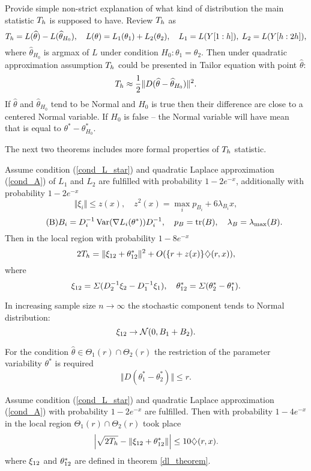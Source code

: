 Provide simple non-strict explanation of what kind of distribution the main statistic  $T_h$ is supposed to have. Review  $T_h$ as
\[
T_h = L(\widehat{\theta}) -  L(\widehat{\theta}_{H_0}), 
\quad L(\theta) = L_1(\theta_1) + L_2(\theta_2), 
\quad L_1 = L(Y[1:h]), \; L_2 = L(Y[h:2h]), 
\]
where $\widehat{\theta}_{H_0}$ is argmax of $L$ under condition $H_0: \theta_1 =\theta_2$. Then under quadratic approximation assumption $T_h$ could be presented in Tailor equation with point $\widehat{\theta}$:
\[
T_h \approx \frac{1}{2} \Vert D(\widehat{\theta} - \widehat{\theta}_{H_0})  \Vert^2.
\]   
If $\widehat{\theta}$ and $\widehat{\theta}_{H_0}$ tend to be Normal and $H_0$ is true then their difference are close to a centered Normal variable. If $H_0$ is false -- the Normal variable will have mean that  is equal to $\theta^* - \theta_{H_0}^*$. 

The next two theorems includes more formal properties of $T_h$ statistic.  

\begin{theorem}
\label{dl_theorem}
Assume condition (\ref{cond_L_star}) and quadratic Laplace approximation (\ref{cond_A}) of $L_1$ and $L_2$   are fulfilled with probability $1 - 2 e^{-x}$, additionally with probability $1 - 2 e^{-x}$
\[
\Vert \xi_i \Vert \leq z(x), 
\quad z^2(x) = \max_i p_{B_i} + 6 \lambda_{B_i} x,
\] 
\[\tag{B}
B_i = D_i^{-1} \operatorname{Var} (\nabla L_i(\theta^*))D_i^{-1},
\quad p_B = \operatorname{tr}(B), 
\quad \lambda_B  = \lambda_{\max} (B).
\]
Then in the local region with probability $1 - 8 e^{-x}$ 
\[
2 T_h = \Vert  \xi_{12} + \theta_{12}^* \Vert^2  + O(\{r + z(x)\} \diamondsuit (r, x)),
\]
where
\[
\xi_{12}  = \varSigma (D_2^{-1} \xi_2 - D_1^{-1} \xi_1),
\quad
\theta_{12}^*  = \varSigma (\theta_2^* - \theta_1^*).
\]
\end{theorem}    

\begin{remark} 
\label{dxi_limit}
In increasing sample size $n \to \infty$ the stochastic component tends to Normal distribution: 
\[
\xi_{12} \to \mathcal{N}(0, B_1 + B_2).
\]
\end{remark}

\begin{remark}
For the condition $\widehat{\theta} \in \Theta_1(r) \cap \Theta_2(r)$ the restriction of the parameter variability $\theta^*$ is required
\begin{equation}\label{cond_L_star}
\tag{L*}
\Vert D(\theta_1^* - \theta_2^*) \Vert \leq r.
\end{equation}
\end{remark}


\begin{theorem}
\label{dl_sq_theorem}
Assume condition (\ref{cond_L_star}) and quadratic Laplace approximation (\ref{cond_A}) with probability $1 - 2 e^{-x}$ are fulfilled. Then  with probability $1 - 4 e^{-x}$ in the local region  $\Theta_1(r) \cap \Theta_2(r)$ took place
\[
\left| 
\sqrt{ 2T_h} - 
\Vert \xi_{12} + \theta_{12}^* \Vert 
\right| \leq 
10  \diamondsuit (r, x).
\]
where $\xi_{12}$ and $\theta_{12}^*$ are defined in theorem \ref{dl_theorem}.
\end{theorem}


